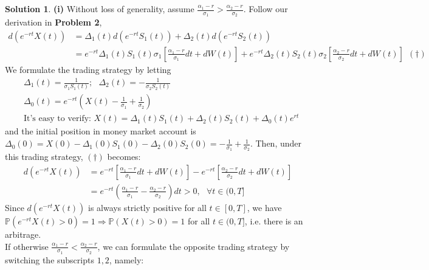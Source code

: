 \documentclass[a4paper, 10pt]{article}
\theoremstyle{definition}
\theoremstyle{hSol}
\newtheorem*{solution}{Solution}
\begin{document}
\begin{solution} \textbf{(i)} Without loss of generality, assume $\frac{\alpha_1- r}{\sigma_1} > \frac{\alpha_2- r}{\sigma_2} $. Follow our derivation in \textbf{Problem 2},
\begin{equation}
	\begin{split}
		d(e^{-rt}X(t)) &= \Delta_1(t)d(e^{-rt}S_1(t)) + \Delta_2(t)d(e^{-rt}S_2(t))\\ 
		&=
		e^{-rt}\Delta_1(t)S_1(t)\sigma_1\left[\frac{\alpha_1 - r}{\sigma_1}dt + dW(t)\right] +e^{-rt}\Delta_2(t)S_2(t)\sigma_2\left[\frac{\alpha_2 - r}{\sigma_2}dt + dW(t)\right]~~(\dag)
	\end{split}
\end{equation}
We formulate the trading strategy by letting
\begin{equation}
	\begin{split}
		&\Delta_1(t) = \frac{1}{\sigma_1S_1(t)};~~~\Delta_2(t) = -\frac{1}{\sigma_2S_2(t)} \\
		&\Delta_0(t) = e^{-rt}\left(X(t)-\frac{1}{\sigma_1}+\frac{1}{\sigma_2}\right)\\
		&\text{It's easy to verify: }X(t) = \Delta_1(t)S_1(t) + \Delta_2(t)S_2(t) + \Delta_0(t) e^{rt}
	\end{split}
\end{equation}
and the initial position in money market account is $\Delta_0(0) = X(0)-\Delta_1(0)S_1(0)-\Delta_2(0)S_2(0) = -\frac{1}{\sigma_1}+\frac{1}{\sigma_2}$.
Then, under this trading strategy, $(\dag)$ becomes:
\begin{equation}
	\begin{split}
		d(e^{-rt}X(t)) &= e^{-rt}\left[\frac{\alpha_1 - r}{\sigma_1}dt +dW(t)\right] - e^{-rt}\left[\frac{\alpha_2 - r}{\sigma_2}dt +dW(t)\right] \\
		&= e^{-rt}\left(\frac{\alpha_1 - r}{\sigma_1}-\frac{\alpha_2 - r}{\sigma_2}\right)dt > 0,~~~\forall t\in (0,T]
	\end{split}
\end{equation}
Since $d(e^{-rt}X(t))$ is always strictly positive for all $t\in [0,T]$, we have $\mathbb{P}\left(e^{-rt}X(t)>0\right) = 1 \Rightarrow \mathbb{P}\left(X(t)>0\right) = 1$ for all $t\in (0, T]$, i.e. there is an arbitrage.\\
If otherwise $\frac{\alpha_1- r}{\sigma_1} < \frac{\alpha_2- r}{\sigma_2} $, we can formulate the opposite trading strategy by switching the subscripts $1,2$, namely:
\begin{equation}
	\begin{split}

\end{split}
\end{equation}
\end{solution}
\end{document}
